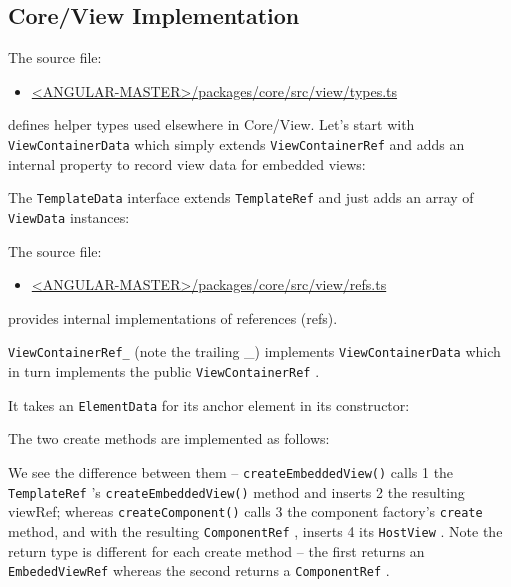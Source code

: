 \subsection{Core/View Implementation}

The source file:

\begin{itemize}
  \item \href{https://github.com/angular/angular/blob/master/packages/core/src/view/types.ts}
        {<ANGULAR-MASTER>/packages/core/src/view/types.ts}
\end{itemize}

defines helper types used elsewhere in Core/View. Let’s start with
\texttt{ViewContainerData}
which simply extends
\texttt{ViewContainerRef}
and adds an internal
property to record view data for embedded views:



The
\texttt{TemplateData}
interface extends
\texttt{TemplateRef}
and just adds an array of
\texttt{ViewData}
instances:



The source file:

\begin{itemize}
  \item \href{https://github.com/angular/angular/blob/master/packages/core/src/view/refs.ts}
        {<ANGULAR-MASTER>/packages/core/src/view/refs.ts}
\end{itemize}

provides internal implementations of references (refs).

\texttt{ViewContainerRef\_}
(note the trailing \_) implements
\texttt{ViewContainerData}
which in
turn implements the public
\texttt{ViewContainerRef}
.

It takes an
\texttt{ElementData}
for its anchor element in its constructor:



The two create methods are implemented as follows:



We see the difference between them –
\texttt{createEmbeddedView()}
calls
1
the
\texttt{TemplateRef}
’s
\texttt{createEmbeddedView()}
method and inserts
2
the resulting viewRef;
whereas
\texttt{createComponent()}
calls
3
the component factory’s
\texttt{create}
method, and
with the resulting
\texttt{ComponentRef}
, inserts
4
its
\texttt{HostView}
. Note the return type is
different for each create method – the first returns an
\texttt{EmbededViewRef}
whereas the
second returns a
\texttt{ComponentRef}
.

